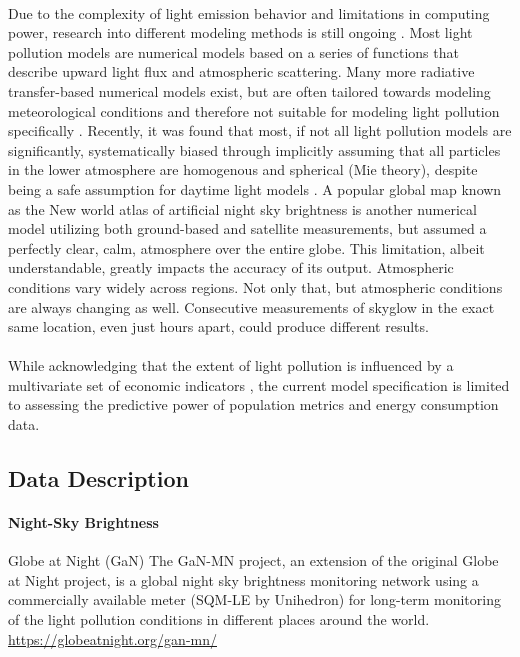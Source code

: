 \documentclass[11 pt]{article}  %
\begin{document}
\paragraph{}Due to the complexity of light emission behavior and limitations in computing 
power, research into different modeling methods is still ongoing \cite{Kollath}. 
Most light pollution models are numerical models based on a series of functions 
that describe upward light flux and atmospheric scattering. Many more radiative 
transfer-based numerical models exist, but are often tailored towards modeling 
meteorological conditions and therefore not suitable for modeling light pollution 
specifically \cite{Kollath}. Recently, it was found that most, if not all light 
pollution models are significantly, systematically biased through implicitly 
assuming that all particles in the lower atmosphere are homogenous and spherical 
(Mie theory), despite being a safe assumption for daytime light models \cite{Kocifaj}. 
A popular global map known as the New world atlas of artificial night sky 
brightness \cite{Falchi} is another numerical model utilizing both ground-based 
and satellite measurements, but assumed a perfectly clear, calm, atmosphere over 
the entire globe. This limitation, albeit understandable, greatly impacts the 
accuracy of its output. Atmospheric conditions vary widely across regions. Not 
only that, but atmospheric conditions are always changing as well. Consecutive 
measurements of skyglow in the exact same location, even just hours apart, could 
produce different results.

\paragraph{}While acknowledging that the extent of light pollution is influenced by a 
multivariate set of economic indicators \cite{Olsen}, the current model 
specification is limited to assessing the predictive power of population metrics 
and energy consumption data.

\subsection{Data Description}

\paragraph{Night-Sky Brightness}Globe at Night (GaN) The GaN-MN project, an 
extension of the original Globe at Night project, is a global night sky brightness 
monitoring network using a commercially available meter (SQM-LE by Unihedron) for 
long-term monitoring of the light pollution conditions in different places around 
the world.\\
\url{https://globeatnight.org/gan-mn/}
\end{document}
